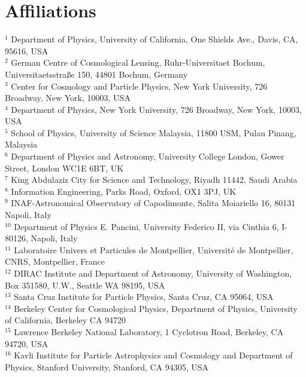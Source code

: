 \documentclass[\docopts]{\docclass}
\begin{document}





\section*{Affiliations}
$^{1}$ Department of Physics, University of California, One Shields Ave., Davis, CA, 95616, USA\\
$^{2}$ German Centre of Cosmological Lensing, Ruhr-Universitaet Bochum, Universitaetsstra{\ss}e 150, 44801 Bochum, Germany\\
$^{3}$ Center for Cosmology and Particle Physics, New York University, 726 Broadway, New York, 10003, USA\\
$^{4}$ Department of Physics, New York University, 726 Broadway, New York, 10003, USA\\
$^{5}$ School of Physics, University of Science Malaysia, 11800 USM, Pulau Pinang, Malaysia\\
$^{6}$ Department of Physics and Astronomy, University College London, Gower Street, London WC1E 6BT, UK\\
$^{7}$ King Abdulaziz City for Science and Technology, Riyadh 11442, Saudi Arabia\\
$^{8}$ Information Engineering, Parks Road, Oxford, OX1 3PJ, UK\\
$^{9}$ INAF-Astronomical Observatory of Capodimonte, Salita Moiariello 16, 80131 Napoli, Italy\\
$^{10}$ Department of Physics E. Pancini, University Federico II, via Cinthia 6, I-80126, Napoli, Italy\\
$^{11}$ Laboratoire Univers et Particules de Montpellier, Universit\'e de Montpellier, CNRS, Montpellier, France\\
$^{12}$ DIRAC Institute and Department of Astronomy, University of Washington, Box 351580, U.W., Seattle WA 98195, USA\\
$^{13}$ Santa Cruz Institute for Particle Physics, Santa Cruz, CA 95064, USA\\
$^{14}$ Berkeley Center for Cosmological Physics, Department of Physics, University of California, Berkeley CA 94720\\
$^{15}$ Lawrence Berkeley National Laboratory, 1 Cyclotron Road, Berkeley, CA 94720, USA\\
$^{16}$ Kavli Institute for Particle Astrophysics and Cosmology and Department of Physics, Stanford University, Stanford, CA 94305, USA\\
\end{document}
